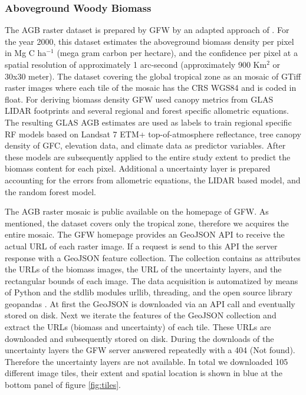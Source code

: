 		\subsubsection{Aboveground Woody Biomass}
			The \ac{AGB} raster dataset is prepared by \ac{GFW} by an adapted approach of \citeauthor{Baccini2012} \citep{Baccini2012,Baccini2015,Baccini2017}. For the year 2000, this dataset estimates the aboveground biomass density per pixel in Mg C ha$^{-1}$ (mega gram carbon per hectare), and the confidence per pixel at a spatial resolution of approximately 1 arc-second (approximately 900 Km$^2$ or 30x30 meter). The dataset covering the global tropical zone as an mosaic of \ac{GTiff} raster images where each tile of the mosaic has the \ac{CRS} \ac{WGS84} and is coded in float. For deriving biomass density \ac{GFW} used canopy metrics from \ac{GLAS} \ac{LIDAR} footprints and several regional and forest specific allometric equations. The resulting \ac{GLAS} \ac{AGB} estimates are used as labels to train regional specific \ac{RF} models based on Landsat 7 \ac{ETM+} top-of-atmosphere reflectance, tree canopy density of \ac{GFC}, elevation data, and climate data as predictor variables. After these models are subsequently applied to the entire study extent to predict the biomass content for each pixel. Additional a uncertainty layer is prepared accounting for the errors from allometric equations, the \ac{LIDAR} based model, and the random forest model.

			The \ac{AGB} raster mosaic is public available on the homepage of \ac{GFW}. As mentioned, the dataset covers only the tropical zone, therefore we acquires the entire mosaic. The \ac{GFW} homepage provides an \ac{GeoJSON} \ac{API} to receive the actual \ac{URL} of each raster image. If a request is send to this \ac{API} the server response with a \ac{GeoJSON} feature collection. The collection contains as attributes the \ac{URL}s of the biomass images, the \ac{URL} of the uncertainty layers, and the rectangular bounds of each image. The data acquisition is automatized by means of Python and the \ac{stdlib} modules urllib, threading, and the open source library geopandas \citep{Rossum2018,McKinney2010}. At first the \ac{GeoJSON} is downloaded via an \ac{API} call and eventually stored on disk. Next we iterate the features of the \ac{GeoJSON} collection and extract the \ac{URL}s (biomass and uncertainty) of each tile. These \ac{URL}s are downloaded and subsequently stored on disk. During the downloads of the uncertainty layers the \ac{GFW} server answered repeatedly with a 404 (Not found). Therefore the uncertainty layers are not available. In total we downloaded 105 different image tiles, their extent and spatial location is shown in blue at the bottom panel of figure \ref{fig:tiles}.


